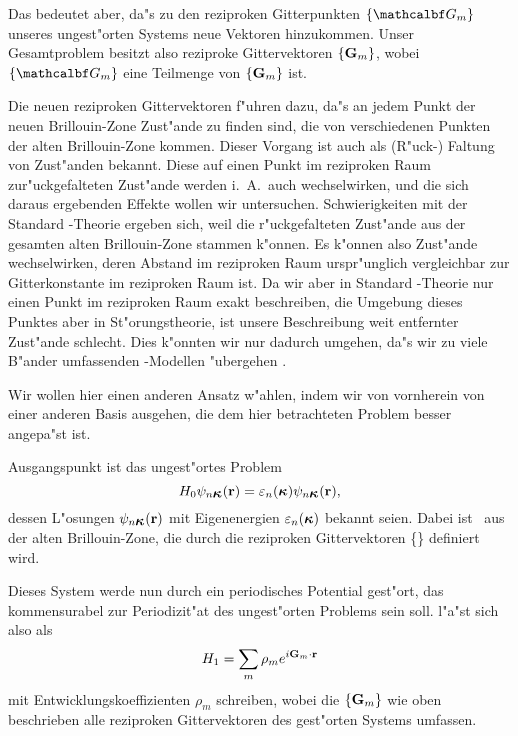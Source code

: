 Das bedeutet aber, da"s zu den reziproken Gitterpunkten $\{\aG\}$ unseres
ungest"orten Systems neue Vektoren hinzukommen. Unser Gesamtproblem besitzt
also reziproke Gittervektoren $\{\mathbf{G}_{\mathnormal{m}}\}$, wobei
$\{\aG\}$ eine Teilmenge
von $\{\mathbf{G}_{\mathnormal{m}}\}$ ist.

Die neuen reziproken Gittervektoren f"uhren dazu, da"s an jedem Punkt der
neuen Brillouin-Zone Zust"ande zu finden sind, die von verschiedenen Punkten
der alten Brillouin-Zone kommen. Dieser Vorgang ist auch als (R"uck-) Faltung
von Zust"anden bekannt. Diese auf einen Punkt im reziproken Raum
zur"uckgefalteten Zust"ande werden i.~A.\ auch wechselwirken, und die sich
daraus ergebenden Effekte wollen wir untersuchen. Schwierigkeiten mit der
Standard \kdotp-Theorie ergeben sich, weil die r"uckgefalteten Zust"ande aus
der gesamten alten Brillouin-Zone stammen k"onnen. Es k"onnen also Zust"ande
wechselwirken, deren Abstand im reziproken Raum urspr"unglich vergleichbar zur
Gitterkonstante im reziproken Raum ist. Da wir aber in Standard \kdotp-Theorie
nur einen Punkt im reziproken Raum exakt beschreiben, die Umgebung dieses
Punktes aber in St"orungstheorie, ist unsere Beschreibung weit entfernter
Zust"ande schlecht. Dies k"onnten wir nur dadurch umgehen, da"s wir zu viele
B"ander umfassenden \kdotp-Modellen "ubergehen \cite{wazu:96}.

Wir wollen hier einen anderen Ansatz w"ahlen, indem wir von vornherein von
einer anderen Basis ausgehen, die dem hier betrachteten Problem besser
angepa"st ist.


Ausgangspunkt ist das ungest"ortes Problem
%
\begin{equation}
  \label{eq:ungestoert}
  \op{H_{0}}\psi_{n\ak}(\vec{r}) = \veps_{n}(\ak) \psi_{n\ak}(\vec{r}),
\end{equation}
%
dessen L"osungen $\psi_{n\ak}(\vec{r})$ mit Eigenenergien $\veps_{n}(\ak)$
bekannt seien. Dabei ist \ak\ aus der alten Brillouin-Zone, die durch die
reziproken Gittervektoren \{\aG\} definiert wird.

Dieses System werde nun durch ein periodisches Potential  gest"ort,
das kommensurabel zur Periodizit"at des ungest"orten Problems sein soll.
 l"a"st sich also als
%
\begin{equation}
  \label{eq:h1-Gm}
  \protect H_{1} = \sum_{m} \rho_{m} e^{i\mathbf{\mathbf{G}_{\mathnormal{m}}} \cdot \mathbf{r} }
\end{equation}
%
mit Entwicklungskoeffizienten $\rho_{m}$ schreiben, wobei die $\{\mathbf{G}_{\mathnormal{m}}\}$ wie
oben beschrieben alle reziproken Gittervektoren des gest"orten Systems
umfassen.


